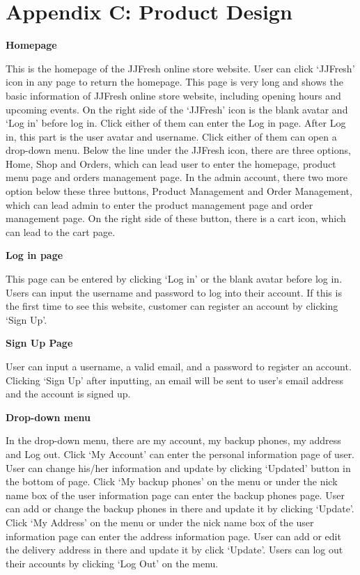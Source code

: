 \chapter*{Appendix C: Product Design}

\textbf{Homepage}

This is the homepage of the JJFresh online store website. User can click ‘JJFresh’ icon in any page to return the homepage.
This page is very long and shows the basic information of JJFresh online store website, including opening hours and upcoming events.
On the right side of the ‘JJFresh’ icon is the blank avatar and ‘Log in’ before log in. Click either of them can enter the Log in page. After Log in, this part is the user avatar and username. Click either of them can open a drop-down menu.
Below the line under the JJFresh icon, there are three options, Home, Shop and Orders, which can lead user to enter the homepage, product menu page and orders management page. In the admin account, there two more option below these three buttons, Product Management and Order Management, which can lead admin to enter the product management page and order management page. On the right side of these button, there is a cart icon, which can lead to the cart page.

\textbf{Log in page}

This page can be entered by clicking ‘Log in’ or the blank avatar before log in. Users can input the username and password to log into their account. If this is the first time to see this website, customer can register an account by clicking ‘Sign Up’.

\textbf{Sign Up Page}

User can input a username, a valid email, and a password to register an account. Clicking ‘Sign Up’ after inputting, an email will be sent to user’s email address and the account is signed up.

\textbf{Drop-down menu}

In the drop-down menu, there are my account, my backup phones, my address and Log out. Click ‘My Account’ can enter the personal information page of user. User can change his/her information and update by clicking ‘Updated’ button in the bottom of page.
Click ‘My backup phones’ on the menu or under the nick name box of the user information page can enter the backup phones page. User can add or change the backup phones in there and update it by clicking ‘Update’.
Click ‘My Address’ on the menu or under the nick name box of the user information page can enter the address information page. User can add or edit the delivery address in there and update it by click ‘Update’. 
Users can log out their accounts by clicking ‘Log Out’ on the menu.


